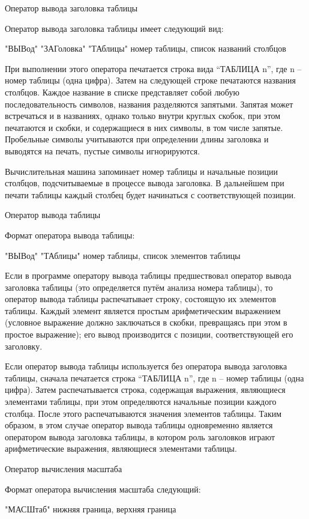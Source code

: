 \documentclass[11pt]{article}
\begin{document}
Оператор вывода заголовка таблицы

Оператор вывода заголовка таблицы
имеет следующий вид:

"ВЫВод" "ЗАГоловка" "ТАблицы" номер
таблицы, список названий столбцов

При выполнении этого оператора
печатается строка вида “ТАБЛИЦА n”,
где n – номер таблицы (одна цифра). Затем
на следующей строке печатаются
названия столбцов. Каждое название в
списке представляет собой любую
последовательность символов, названия
разделяются запятыми. Запятая может
встречаться и в названиях, однако
только внутри круглых скобок, при этом
печатаются и скобки, и содержащиеся в
них символы, в том числе запятые.
Пробельные символы учитываются при
определении длины заголовка и
выводятся на печать, пустые символы
игнорируются.

Вычислительная машина запоминает
номер таблицы и начальные позиции
столбцов, подсчитываемые в процессе
вывода заголовка. В дальнейшем при
печати таблицы каждый столбец будет
начинаться с соответствующей позиции.

Оператор вывода таблицы

Формат оператора вывода таблицы:

"ВЫВод" "ТАблицы" номер таблицы, список
элементов таблицы

Если в программе оператору вывода
таблицы предшествовал оператор вывода
заголовка таблицы (это определяется
путём анализа номера таблицы), то
оператор вывода таблицы распечатывает
строку, состоящую их элементов таблицы.
Каждый элемент является простым
арифметическим выражением (условное
выражение должно заключаться в скобки,
превращаясь при этом в простое
выражение); его вывод производится с
позиции, соответствующей его
заголовку.

Если оператор вывода таблицы
используется без оператора вывода
заголовка таблицы, сначала печатается
строка “ТАБЛИЦА n”, где n – номер
таблицы (одна цифра). Затем
распечатывается строка, содержащая
выражения, являющиеся элементами
таблицы, при этом определяются
начальные позиции каждого столбца.
После этого распечатываются значения
элементов таблицы. Таким образом, в
этом случае оператор вывода таблицы
одновременно является оператором
вывода заголовка таблицы, в котором
роль заголовков играют арифметические
выражения, являющиеся элементами
таблицы.

Оператор вычисления масштаба

Формат оператора вычисления масштаба
следующий:

"МАСШтаб" нижняя граница, верхняя
граница
\end{document}
